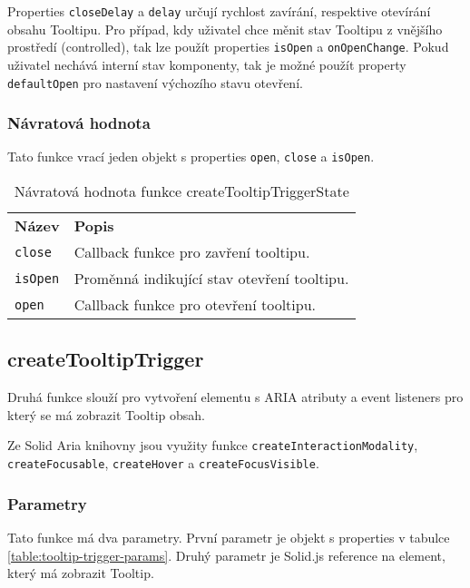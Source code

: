 Properties \texttt{closeDelay} a \texttt{delay} určují rychlost zavírání, respektive otevírání obsahu Tooltipu.
Pro případ, kdy uživatel chce měnit stav Tooltipu z vnějšího prostředí (controlled), tak lze použít properties \texttt{isOpen} a \texttt{onOpenChange}.
Pokud uživatel nechává interní stav komponenty, tak je možné použít property \texttt{defaultOpen} pro nastavení výchozího stavu otevření.

\subsubsection{Návratová hodnota}

Tato funkce vrací jeden objekt s properties \texttt{open}, \texttt{close} a \texttt{isOpen}.

\begin{table}[ht]\label{table:tooltip-trigger-state-return}
    \begin{ctucolortab}
        \begin{tabularx}{\textwidth}{p{3cm} X}
            \bfseries Název & \bfseries Popis                             \\\Midrule{}
            \texttt{close}  & Callback funkce pro zavření tooltipu.       \\
            \texttt{isOpen} & Proměnná indikující stav otevření tooltipu. \\
            \texttt{open}   & Callback funkce pro otevření tooltipu.
        \end{tabularx}
    \end{ctucolortab}
    \caption{Návratová hodnota funkce createTooltipTriggerState}
\end{table}

\subsection{createTooltipTrigger}

Druhá funkce slouží pro vytvoření elementu s ARIA atributy a event listeners pro který se má zobrazit Tooltip obsah.

Ze Solid Aria knihovny jsou využity funkce \texttt{createInteractionModality}, \texttt{createFocusable}, \texttt{createHover} a \texttt{createFocusVisible}.

\subsubsection{Parametry}

Tato funkce má dva parametry.
První parametr je objekt s properties v tabulce \ref{table:tooltip-trigger-params}.
Druhý parametr je Solid.js reference na element, který má zobrazit Tooltip.

